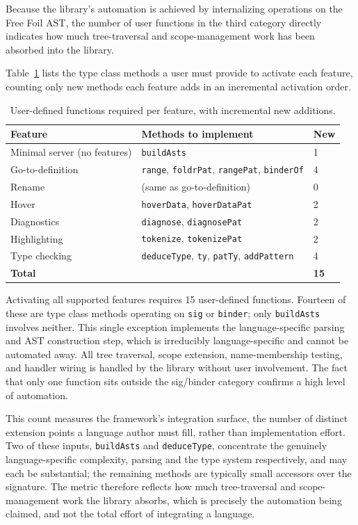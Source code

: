 Because the library's automation is achieved by internalizing operations on the Free Foil AST, the number of user functions in the third category directly indicates how much tree-traversal and scope-management work has been absorbed into the library.

Table~\ref{tab:automation} lists the type class methods a user must provide to activate each feature, counting only new methods each feature adds in an incremental activation order.

\begin{table}[h]
\centering
\begin{tabular}{lll}
\hline
\textbf{Feature} & \textbf{Methods to implement} & \textbf{New} \\
\hline
Minimal server (no features) & \texttt{buildAsts} & 1 \\
Go-to-definition & \texttt{range}, \texttt{foldrPat}, \texttt{rangePat}, \texttt{binderOf} & 4 \\
Rename & (same as go-to-definition) & 0 \\
Hover & \texttt{hoverData}, \texttt{hoverDataPat} & 2 \\
Diagnostics & \texttt{diagnose}, \texttt{diagnosePat} & 2 \\
Highlighting & \texttt{tokenize}, \texttt{tokenizePat} & 2 \\
Type checking & \texttt{deduceType}, \texttt{ty}, \texttt{patTy}, \texttt{addPattern} & 4 \\
\hline
\textbf{Total} & & \textbf{15} \\
\hline
\end{tabular}
\caption{User-defined functions required per feature, with incremental new additions.}
\label{tab:automation}
\end{table}

Activating all supported features requires 15 user-defined functions.
Fourteen of these are type class methods operating on \texttt{sig} or \texttt{binder}; only \texttt{buildAsts} involves neither.
This single exception implements the language-specific parsing and AST construction step, which is irreducibly language-specific and cannot be automated away.
All tree traversal, scope extension, name-membership testing, and handler wiring is handled by the library without user involvement.
The fact that only one function sits outside the sig/binder category confirms a high level of automation.

This count measures the framework's integration surface, the number of distinct extension points a language author must fill, rather than implementation effort.
Two of these inputs, \texttt{buildAsts} and \texttt{deduceType}, concentrate the genuinely language-specific complexity, parsing and the type system respectively, and may each be substantial; the remaining methods are typically small accessors over the signature.
The metric therefore reflects how much tree-traversal and scope-management work the library absorbs, which is precisely the automation being claimed, and not the total effort of integrating a language.

